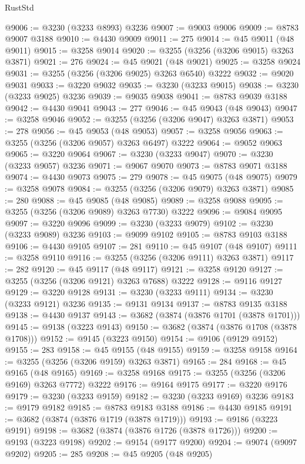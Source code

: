 \begin{lexlean}{RustStd}
\begin{coremodule}
{\begin{coremodule}
{{{{{{{{{{{{{{{{{{{{{{{{{{{{{{{{{{{{{@9006 := @3230 (@3233 @8993) @3236
@9007 := @9003 @9006
@9009 := @8783 @9007 @3188
@9010 := @4430 @9009
@9011 := 275
@9014 := @45 @9011 (@48 @9011)
@9015 := @3258 @9014
@9020 := @3255 (@3256 (@3206 @9015) @3263 @3871)
@9021 := 276
@9024 := @45 @9021 (@48 @9021)
@9025 := @3258 @9024
@9031 := @3255 (@3256 (@3206 @9025) @3263 @6540) @3222
@9032 := @9020 @9031
@9033 := @3220 @9032
@9035 := @3230 (@3233 @9015)
@9038 := @3230 (@3233 @9025) @3236
@9039 := @9035 @9038
@9041 := @8783 @9039 @3188
@9042 := @4430 @9041
@9043 := 277
@9046 := @45 @9043 (@48 @9043)
@9047 := @3258 @9046
@9052 := @3255 (@3256 (@3206 @9047) @3263 @3871)
@9053 := 278
@9056 := @45 @9053 (@48 @9053)
@9057 := @3258 @9056
@9063 := @3255 (@3256 (@3206 @9057) @3263 @6497) @3222
@9064 := @9052 @9063
@9065 := @3220 @9064
@9067 := @3230 (@3233 @9047)
@9070 := @3230 (@3233 @9057) @3236
@9071 := @9067 @9070
@9073 := @8783 @9071 @3188
@9074 := @4430 @9073
@9075 := 279
@9078 := @45 @9075 (@48 @9075)
@9079 := @3258 @9078
@9084 := @3255 (@3256 (@3206 @9079) @3263 @3871)
@9085 := 280
@9088 := @45 @9085 (@48 @9085)
@9089 := @3258 @9088
@9095 := @3255 (@3256 (@3206 @9089) @3263 @7730) @3222
@9096 := @9084 @9095
@9097 := @3220 @9096
@9099 := @3230 (@3233 @9079)
@9102 := @3230 (@3233 @9089) @3236
@9103 := @9099 @9102
@9105 := @8783 @9103 @3188
@9106 := @4430 @9105
@9107 := 281
@9110 := @45 @9107 (@48 @9107)
@9111 := @3258 @9110
@9116 := @3255 (@3256 (@3206 @9111) @3263 @3871)
@9117 := 282
@9120 := @45 @9117 (@48 @9117)
@9121 := @3258 @9120
@9127 := @3255 (@3256 (@3206 @9121) @3263 @7688) @3222
@9128 := @9116 @9127
@9129 := @3220 @9128
@9131 := @3230 (@3233 @9111)
@9134 := @3230 (@3233 @9121) @3236
@9135 := @9131 @9134
@9137 := @8783 @9135 @3188
@9138 := @4430 @9137
@9143 := @3682 (@3874 (@3876 @1701 (@3878 @1701)))
@9145 := @9138 (@3223 @9143)
@9150 := @3682 (@3874 (@3876 @1708 (@3878 @1708)))
@9152 := @9145 (@3223 @9150)
@9154 := @9106 (@9129 @9152)
@9155 := 283
@9158 := @45 @9155 (@48 @9155)
@9159 := @3258 @9158
@9164 := @3255 (@3256 (@3206 @9159) @3263 @3871)
@9165 := 284
@9168 := @45 @9165 (@48 @9165)
@9169 := @3258 @9168
@9175 := @3255 (@3256 (@3206 @9169) @3263 @7772) @3222
@9176 := @9164 @9175
@9177 := @3220 @9176
@9179 := @3230 (@3233 @9159)
@9182 := @3230 (@3233 @9169) @3236
@9183 := @9179 @9182
@9185 := @8783 @9183 @3188
@9186 := @4430 @9185
@9191 := @3682 (@3874 (@3876 @1719 (@3878 @1719)))
@9193 := @9186 (@3223 @9191)
@9198 := @3682 (@3874 (@3876 @1726 (@3878 @1726)))
@9200 := @9193 (@3223 @9198)
@9202 := @9154 (@9177 @9200)
@9204 := @9074 (@9097 @9202)
@9205 := 285
@9208 := @45 @9205 (@48 @9205)
}}}}}}}}}}}}}}}}}}}}}}}}}}}}}}}}}}}}}
\end{coremodule}}
\end{coremodule}
\end{lexlean}
